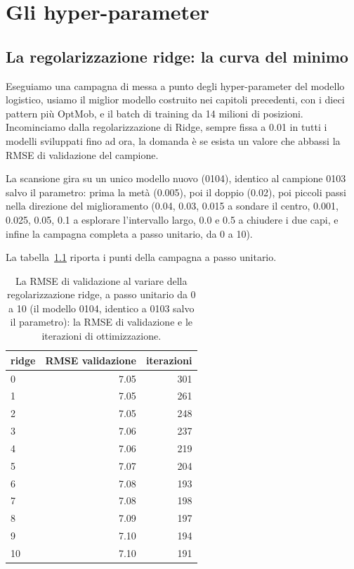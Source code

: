\chapter{Gli hyper-parameter}

\section{La regolarizzazione ridge: la curva del minimo}

Eseguiamo una campagna di messa a punto degli hyper-parameter del
modello logistico, usiamo il miglior modello costruito nei capitoli
precedenti, con i dieci pattern più OptMob, e il batch di training da
14 milioni di posizioni. Incominciamo dalla regolarizzazione di
Ridge, sempre fissa a 0.01 in tutti i modelli sviluppati fino ad ora,
la domanda è se esista un valore che abbassi la RMSE di validazione
del campione.

La scansione gira su un unico modello nuovo (0104), identico al
campione 0103 salvo il parametro: prima la metà (0.005), poi il doppio
(0.02), poi piccoli passi nella direzione del miglioramento (0.04,
0.03, 0.015 a sondare il centro, 0.001, 0.025, 0.05, 0.1 a
esplorare l'intervallo largo, 0.0 e 0.5 a chiudere i due capi, e
infine la campagna completa a passo unitario, da 0 a 10).

La tabella~\ref{tab:ridge-curva} riporta i punti della campagna a
passo unitario.

\begin{table}[ht]
\centering
\begin{tabular}{lrr}
\toprule
ridge & RMSE validazione & iterazioni \\
\midrule
0  & 7.05 & 301 \\
1  & 7.05 & 261 \\
2  & 7.05 & 248 \\
3  & 7.06 & 237 \\
4  & 7.06 & 219 \\
5  & 7.07 & 204 \\
6  & 7.08 & 193 \\
7  & 7.08 & 198 \\
8  & 7.09 & 197 \\
9  & 7.10 & 194 \\
10 & 7.10 & 191 \\
\bottomrule
\end{tabular}
\caption{La RMSE di validazione al variare della regolarizzazione
ridge, a passo unitario da 0 a 10 (il modello 0104, identico a 0103
salvo il parametro): la RMSE di validazione e le iterazioni di
ottimizzazione.}
\label{tab:ridge-curva}
\end{table}


